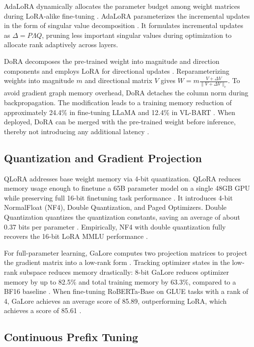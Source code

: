\documentclass[11pt,a4paper]{article}
\begin{document}
AdaLoRA dynamically allocates the parameter budget among weight matrices during LoRA-alike fine-tuning \cite{zhang2023adalora}. AdaLoRA parameterizes the incremental updates in the form of singular value decomposition \cite{zhang2023adalora}. It formulates incremental updates as $\Delta = P \Lambda Q$, pruning less important singular values during optimization to allocate rank adaptively across layers.

DoRA decomposes the pre-trained weight into magnitude and direction components and employs LoRA for directional updates \cite{liu2024dora}. Reparameterizing weights into magnitude $m$ and directional matrix $V$ gives $W = m \frac{V + \Delta V}{\|V + \Delta V\|_c}$. To avoid gradient graph memory overhead, DoRA detaches the column norm during backpropagation. The modification leads to a training memory reduction of approximately 24.4\% in fine-tuning LLaMA and 12.4\% in VL-BART \cite{liu2024dora}. When deployed, DoRA can be merged with the pre-trained weight before inference, thereby not introducing any additional latency \cite{liu2024dora}.

\subsection{Quantization and Gradient Projection}

QLoRA addresses base weight memory via 4-bit quantization. QLoRA reduces memory usage enough to finetune a 65B parameter model on a single 48GB GPU while preserving full 16-bit finetuning task performance \cite{dettmers2023qlora}. It introduces 4-bit NormalFloat (NF4), Double Quantization, and Paged Optimizers. Double Quantization quantizes the quantization constants, saving an average of about 0.37 bits per parameter \cite{dettmers2023qlora}. Empirically, NF4 with double quantization fully recovers the 16-bit LoRA MMLU performance \cite{dettmers2023qlora}.

For full-parameter learning, GaLore computes two projection matrices to project the gradient matrix into a low-rank form \cite{zhao2024galore}. Tracking optimizer states in the low-rank subspace reduces memory drastically: 8-bit GaLore reduces optimizer memory by up to 82.5\% and total training memory by 63.3\%, compared to a BF16 baseline \cite{zhao2024galore}. When fine-tuning RoBERTa-Base on GLUE tasks with a rank of 4, GaLore achieves an average score of 85.89, outperforming LoRA, which achieves a score of 85.61 \cite{zhao2024galore}.

\subsection{Continuous Prefix Tuning}
\end{document}
